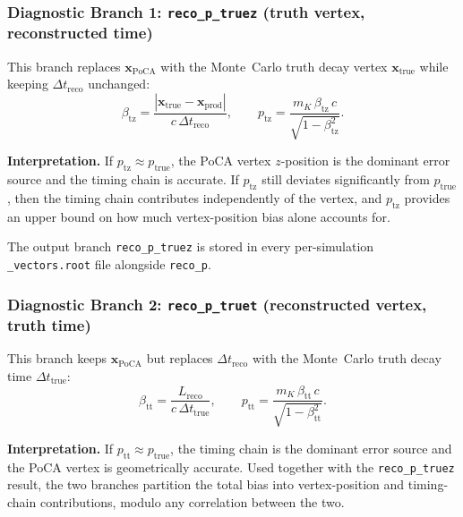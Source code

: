 \subsubsection{Diagnostic Branch 1: \texttt{reco\_p\_truez} (truth vertex, reconstructed time)}

This branch replaces $\bm{x}_{\text{PoCA}}$ with the Monte~Carlo truth decay vertex
$\bm{x}_{\text{true}}$ while keeping $\Delta t_{\text{reco}}$ unchanged:
\begin{equation}
  \beta_{\text{tz}} = \frac{|\bm{x}_{\text{true}} - \bm{x}_{\text{prod}}|}
                          {c\,\Delta t_{\text{reco}}},
  \qquad
  p_{\text{tz}} = \frac{m_K\,\beta_{\text{tz}}\,c}{\sqrt{1 - \beta_{\text{tz}}^2}}.
  \label{eq:p_truez}
\end{equation}

\textbf{Interpretation.}  If $p_{\text{tz}} \approx p_{\text{true}}$, the PoCA vertex
$z$-position is the dominant error source and the timing chain is accurate.  If
$p_{\text{tz}}$ still deviates significantly from $p_{\text{true}}$, then the timing
chain contributes independently of the vertex, and $p_{\text{tz}}$ provides an upper
bound on how much vertex-position bias alone accounts for.

The output branch \texttt{reco\_p\_truez} is stored in every per-simulation
\texttt{\_vectors.root} file alongside \texttt{reco\_p}.

\subsubsection{Diagnostic Branch 2: \texttt{reco\_p\_truet} (reconstructed vertex, truth time)}

This branch keeps $\bm{x}_{\text{PoCA}}$ but replaces $\Delta t_{\text{reco}}$ with the
Monte~Carlo truth decay time $\Delta t_{\text{true}}$:
\begin{equation}
  \beta_{\text{tt}} = \frac{L_{\text{reco}}}{c\,\Delta t_{\text{true}}},
  \qquad
  p_{\text{tt}} = \frac{m_K\,\beta_{\text{tt}}\,c}{\sqrt{1 - \beta_{\text{tt}}^2}}.
  \label{eq:p_truet}
\end{equation}

\textbf{Interpretation.}  If $p_{\text{tt}} \approx p_{\text{true}}$, the timing chain
is the dominant error source and the PoCA vertex is geometrically accurate.  Used
together with the \texttt{reco\_p\_truez} result, the two branches partition the total
bias into vertex-position and timing-chain contributions, modulo any correlation between
the two.

